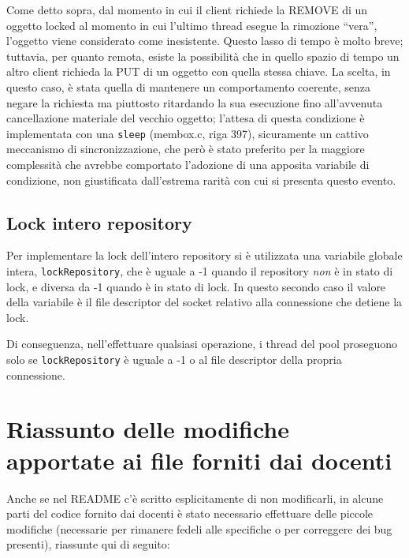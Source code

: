 \documentclass[a4paper,12pt]{article}
\begin{document}
Come detto sopra, dal momento in cui il client richiede la REMOVE di un oggetto locked al momento in cui l'ultimo thread esegue la rimozione ``vera'', l'oggetto viene considerato come inesistente. Questo lasso di tempo è molto breve; tuttavia, per quanto remota, esiste la possibilità che in quello spazio di tempo un altro client richieda la PUT di un oggetto con quella stessa chiave. La scelta, in questo caso, è stata quella di mantenere un comportamento coerente, senza negare la richiesta ma piuttosto ritardando la sua esecuzione fino all'avvenuta cancellazione materiale del vecchio oggetto; l'attesa di questa condizione è implementata con una \texttt{sleep} (membox.c, riga 397), sicuramente un cattivo meccanismo di sincronizzazione, che però è stato preferito per la maggiore complessità che avrebbe comportato l'adozione di una apposita variabile di condizione, non giustificata dall'estrema rarità con cui si presenta questo evento.

\subsection{ Lock intero repository }

Per implementare la lock dell'intero repository si è utilizzata una variabile globale intera, \texttt{lockRepository}, che è uguale a -1 quando il repository \textit{non} è in stato di lock, e diversa da -1 quando è in stato di lock. In questo secondo caso il valore della variabile è il file descriptor del socket relativo alla connessione che detiene la lock.

Di conseguenza, nell'effettuare qualsiasi operazione, i thread del pool proseguono solo se \texttt{lockRepository} è uguale a -1 o al file descriptor della propria connessione.

\section{ Riassunto delle modifiche apportate ai file forniti dai docenti }

Anche se nel README c'è scritto esplicitamente di non modificarli, in alcune parti del codice fornito dai docenti è stato necessario effettuare delle piccole modifiche (necessarie per rimanere fedeli alle specifiche o per correggere dei bug presenti), riassunte qui di seguito:
\end{document}
